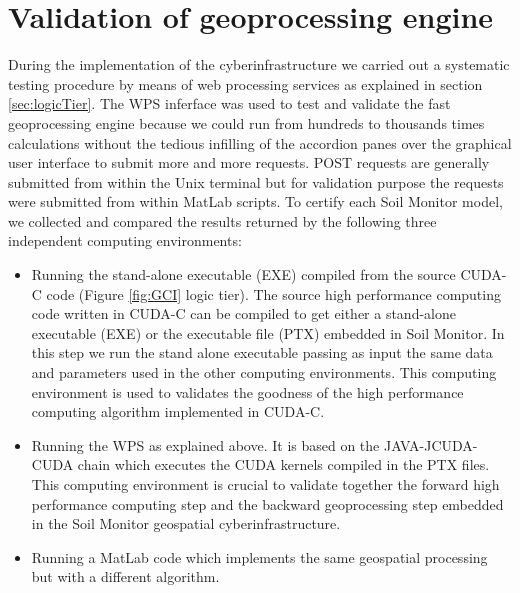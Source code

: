 \documentclass[APA,LATO1COL,doublespace]{WileyNJD-v2}
\newcommand{\update}[1]{\emph{\textcolor{blue}{#1}}}     %
\begin{document}
\section{Validation of geoprocessing engine}\label{sec:validation} %
During the implementation of the 
cyberinfrastructure we carried out a systematic testing procedure by means of web processing services as explained in section \ref{sec:logicTier}.
The WPS inferface was used to test and validate the fast geoprocessing engine because we could run from hundreds to thousands times calculations without the tedious infilling of the accordion panes over the graphical user interface to submit more and more requests.
POST requests are generally submitted from within the Unix terminal but for  validation purpose the requests were submitted from within MatLab scripts. %
To certify each Soil Monitor model, we collected and compared the results returned by the following three independent computing environments:
\begin{itemize}
    \item Running the stand-alone executable (EXE) compiled from the source CUDA-C code (Figure \ref{fig:GCI} logic tier).
    The source high performance computing code written in CUDA-C can be compiled to get either a stand-alone executable (EXE) or the executable file (PTX) embedded in Soil Monitor.
    In this step we run the stand alone executable passing as input the same data and parameters used in the other computing environments.
    This computing environment is used to validates the goodness of the high performance computing algorithm implemented in CUDA-C.
    \item Running the WPS as explained above.
    It is based on the JAVA-JCUDA-CUDA chain which executes the CUDA kernels compiled in the PTX files. This computing environment is crucial to validate together the forward high performance computing step and the backward geoprocessing step embedded in the Soil Monitor geospatial cyberinfrastructure. 
    \item Running a MatLab code which implements the same geospatial processing but with a different algorithm.
\end{itemize}
\end{document}
